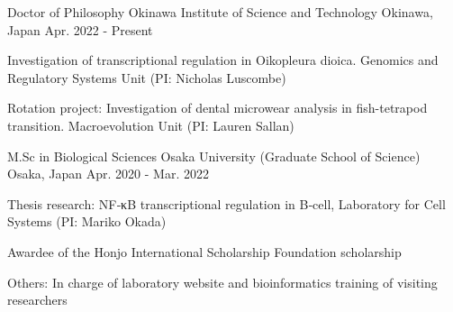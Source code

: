 

\begin{cventries}

  \cventry
    {Doctor of Philosophy} %
    {Okinawa Institute of Science and Technology} %
    {Okinawa, Japan} %
    {Apr. 2022 - Present} %
    {
      \begin{cvitems} %
        \item {Investigation of transcriptional regulation in Oikopleura dioica. Genomics and Regulatory Systems Unit (PI: Nicholas Luscombe)}
        \item {Rotation project: Investigation of dental microwear analysis in fish-tetrapod transition. Macroevolution Unit (PI: Lauren Sallan)}
      \end{cvitems}
    }

\end{cventries}


\begin{cventries}

  \cventry
    {M.Sc in Biological Sciences} %
    {Osaka University (Graduate School of Science)} %
    {Osaka, Japan} %
    {Apr. 2020 - Mar. 2022} %
    {
      \begin{cvitems} %
        \item {Thesis research: NF‑κB transcriptional regulation in B‑cell, Laboratory for Cell Systems (PI: Mariko Okada)}
        \item {Awardee of the Honjo International Scholarship Foundation scholarship}
        \item {Others: In charge of laboratory website and bioinformatics training of visiting researchers}
      \end{cvitems}
    }

\end{cventries}


